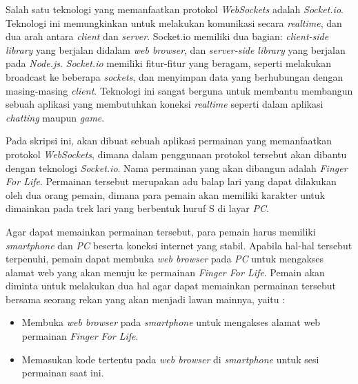 \documentclass[a4paper,twoside]{article}
\begin{document}
Salah satu teknologi yang memanfaatkan protokol \textit{WebSockets} adalah \textit{Socket.io}. Teknologi ini memungkinkan untuk melakukan komunikasi secara \textit{realtime}, dan dua arah antara \textit{client} dan \textit{server}. Socket.io memiliki dua bagian: \textit{client-side library} yang berjalan didalam \textit{web browser}, dan \textit{server-side library} yang berjalan pada \textit{Node.js}. \textit{Socket.io} memiliki fitur-fitur yang beragam, seperti melakukan broadcast ke beberapa \textit{sockets}, dan menyimpan data yang berhubungan dengan masing-masing \textit{client}. Teknologi ini sangat berguna untuk membantu membangun sebuah aplikasi yang membutuhkan koneksi \textit{realtime} seperti dalam aplikasi \textit{chatting} maupun \textit{game}.

Pada skripsi ini, akan dibuat sebuah aplikasi permainan yang memanfaatkan protokol \textit{WebSockets}, dimana dalam penggunaan protokol tersebut akan dibantu dengan teknologi \textit{Socket.io}. Nama permainan yang akan dibangun adalah \textit{Finger For Life}. Permainan tersebut merupakan adu balap lari yang dapat dilakukan oleh dua orang pemain, dimana para pemain akan memiliki karakter untuk dimainkan pada trek lari yang berbentuk huruf S di layar \textit{PC}.


Agar dapat memainkan permainan tersebut, para pemain harus memiliki \textit{smartphone} dan \textit{PC} beserta koneksi internet yang stabil. Apabila hal-hal tersebut terpenuhi, pemain dapat membuka \textit{web browser} pada \textit{PC} untuk mengakses alamat web yang akan menuju ke permainan \textit{Finger For Life}. Pemain akan diminta untuk melakukan dua hal agar dapat memainkan permainan tersebut bersama seorang rekan yang akan menjadi lawan mainnya, yaitu : 

\begin{itemize}
	\item Membuka \textit{web browser} pada \textit{smartphone} untuk mengakses alamat web permainan \textit{Finger For Life}.
	\item Memasukan kode tertentu pada \textit{web browser} di \textit{smartphone} untuk sesi permainan saat ini.
\end{itemize}
\end{document}
